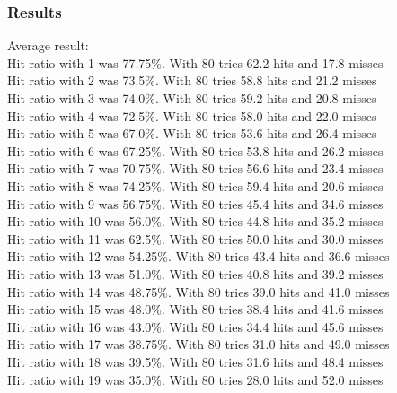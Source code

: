 \documentclass{article}
\begin{document}
\subsubsection*{Results}
Average result:\\ 
Hit ratio with 1 was {\color{green}77.75\%}. With 80 tries 62.2 hits and 17.8 misses\\
Hit ratio with 2 was {\color{green}73.5\%}. With 80 tries 58.8 hits and 21.2 misses\\
Hit ratio with 3 was {\color{green}74.0\%}. With 80 tries 59.2 hits and 20.8 misses\\
Hit ratio with 4 was {\color{green}72.5\%}. With 80 tries 58.0 hits and 22.0 misses\\
Hit ratio with 5 was {\color{yellow}67.0\%}. With 80 tries 53.6 hits and 26.4 misses    \\
Hit ratio with 6 was {\color{yellow}67.25\%}. With 80 tries 53.8 hits and 26.2 misses   \\
Hit ratio with 7 was {\color{green}70.75\%}. With 80 tries 56.6 hits and 23.4 misses    \\
Hit ratio with 8 was {\color{green}74.25\%}. With 80 tries 59.4 hits and 20.6 misses  \\  
Hit ratio with 9 was {\color{red}56.75\%}. With 80 tries 45.4 hits and 34.6 misses  \\
Hit ratio with 10 was {\color{red}56.0\%}. With 80 tries 44.8 hits and 35.2 misses  \\
Hit ratio with 11 was {\color{yellow}62.5\%}. With 80 tries 50.0 hits and 30.0 misses   \\
Hit ratio with 12 was {\color{red}54.25\%}. With 80 tries 43.4 hits and 36.6 misses     \\
Hit ratio with 13 was {\color{red}51.0\%}. With 80 tries 40.8 hits and 39.2 misses    \\  
Hit ratio with 14 was {\color{red}48.75\%}. With 80 tries 39.0 hits and 41.0 misses \\
Hit ratio with 15 was {\color{red}48.0\%}. With 80 tries 38.4 hits and 41.6 misses  \\
Hit ratio with 16 was {\color{red}43.0\%}. With 80 tries 34.4 hits and 45.6 misses  \\
Hit ratio with 17 was {\color{red}38.75\%}. With 80 tries 31.0 hits and 49.0 misses \\
Hit ratio with 18 was {\color{red}39.5\%}. With 80 tries 31.6 hits and 48.4 misses  \\
Hit ratio with 19 was {\color{red}35.0\%}. With 80 tries 28.0 hits and 52.0 misses  \\
\end{document}
